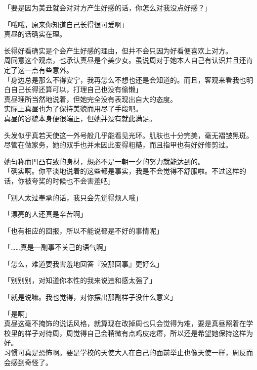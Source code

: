 「要是因为美丑就会对对方产生好感的话，你怎么对我没点好感？」

「哦哦，原来你知道自己长得很可爱啊」\\

真昼的话确实在理。

长得好看确实是个会产生好感的理由，但并不会只因为好看便喜欢上对方。\\

周同意这个观点，也承认真昼是个美少女。虽说周对于她本人自己有认识并且还肯定了这一点有些意外。\\

「身边总是那么不得安宁，我再怎么不想也还是会知道的。而且，客观来看我也明白自己长得还算可以，打理自己也没有偷懒」\\

真昼理所当然地说着，但她完全没有表现出自大的态度。\\

实际上真昼也为了保持美貌而用尽了手段吧。\\

真昼的容貌本身便很端正，但她并没有就此满足。

头发似乎真若天使这一外号般几乎能看见光环。肌肤也十分完美，毫无褶皱黑斑。尽管在做家务，她的双手也并未因此变得粗糙，而且指甲也有好好修剪过。

她匀称而凹凸有致的身材，想必不是一朝一夕的努力就能达到的。\\

「确实啊。你平淡地说着的这些都是事实，我是不会觉得不舒服啦。不过这样的话，你被夸奖的时候也不会害羞吧」

「别人太过奉承的话，我只会先觉得烦人哦」

「漂亮的人还真是辛苦啊」

「也有相应的回报，所以不能说都是不好的事情呢」

「……真是一副事不关己的语气啊」

「怎么，难道要我害羞地回答『没那回事』更好么」

「别别别，对知道你本性的我来说违和感太强了」

「就是说嘛。我也觉得，对你摆出那副样子没什么意义」

「是啊」\\

真昼这毫不掩饰的说话风格，就算现在改掉周也只会觉得为难，要是真昼照着在学校里的样子对待周，周觉得自己会稍微有点鸡皮疙瘩，所以还是希望她保持这样为好。\\

习惯可真是恐怖啊。要是学校的天使大人在自己的面前举止也像天使一样，周反而会感到奇怪了。

